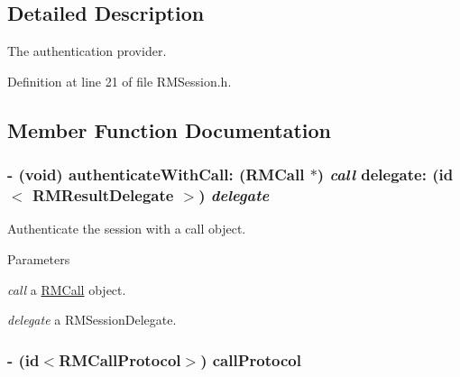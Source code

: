 \subsection{Detailed Description}
The authentication provider. 

Definition at line 21 of file RMSession.h.

\subsection{Member Function Documentation}
\hypertarget{protocol_r_m_authenticator-p_a89800622f7067e082cbb6665f51d44c8}{
\subsubsection[{authenticateWithCall:delegate:}]{\setlength{\rightskip}{0pt plus 5cm}-\/ (void) authenticateWithCall: ({\bf RMCall} $\ast$) {\em call}\/ delegate: (id$<$ {\bf RMResultDelegate} $>$) {\em delegate}}}
\label{protocol_r_m_authenticator-p_a89800622f7067e082cbb6665f51d44c8}


Authenticate the session with a call object. 
\begin{DoxyParams}{Parameters}
\item[{\em call}]a \hyperlink{interface_r_m_call}{RMCall} object. \item[{\em delegate}]a RMSessionDelegate. \end{DoxyParams}
\hypertarget{protocol_r_m_authenticator-p_a1a8ee1ab6eb4014dd3783e096173f000}{
\subsubsection[{callProtocol}]{\setlength{\rightskip}{0pt plus 5cm}-\/ (id$<${\bf RMCallProtocol}$>$) callProtocol }}
\label{protocol_r_m_authenticator-p_a1a8ee1ab6eb4014dd3783e096173f000}


